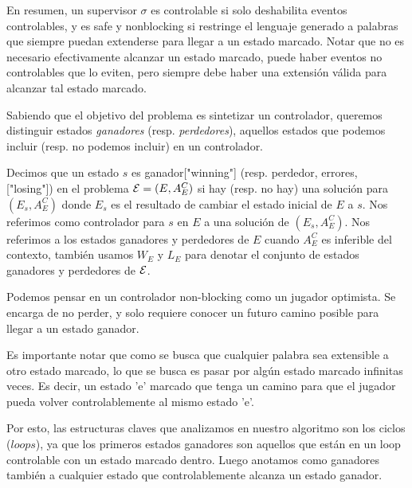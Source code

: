 En resumen, un supervisor $\sigma$ es controlable si solo deshabilita eventos controlables, y es safe y nonblocking si restringe el lenguaje generado a palabras que siempre puedan extenderse para llegar a un estado marcado. Notar que no es necesario efectivamente alcanzar un estado marcado, puede haber eventos no controlables que lo eviten, pero siempre debe haber una extensión válida para alcanzar tal estado marcado.

Sabiendo que el objetivo del problema es sintetizar un controlador, queremos distinguir estados \textit{ganadores} (resp. \textit{perdedores}), aquellos estados que podemos incluir (resp. no podemos incluir) en un controlador. 

\begin{notation}
	Decimos que un estado $s$ es ganador["winning"] (resp. perdedor, errores, ["losing"]) en el problema $\mathcal{E} = (E, A_E^C)$ 
	si hay (resp. no hay) una solución para $(E_s, A_E^C)$ donde $E_s$ es el resultado de cambiar el estado inicial de $E$ a $s$.
	Nos referimos como controlador para $s$ en $E$ a una solución de $(E_s, A_E^C)$.
	Nos referimos a los estados ganadores y perdedores de $E$ cuando $A_E^C$ es inferible del contexto, también usamos $W_E$ y $L_E$ para denotar el conjunto de estados ganadores y perdedores de $\mathcal{E}$.
\end{notation}

Podemos pensar en un controlador non-blocking como un jugador optimista. Se encarga de no perder, y solo requiere conocer un futuro camino posible para llegar a un estado ganador.


Es importante notar que como se busca que cualquier palabra sea extensible a otro estado marcado, lo que se busca es pasar por algún estado marcado infinitas veces. Es decir, un estado 'e' marcado que tenga un camino para que el jugador pueda volver controlablemente al mismo estado 'e'.

Por esto, las estructuras claves que analizamos en nuestro algoritmo son los ciclos ($loops$), ya que los primeros estados ganadores son aquellos que están en un loop controlable con un estado marcado dentro. Luego anotamos como ganadores también a cualquier estado que controlablemente alcanza un estado ganador.

